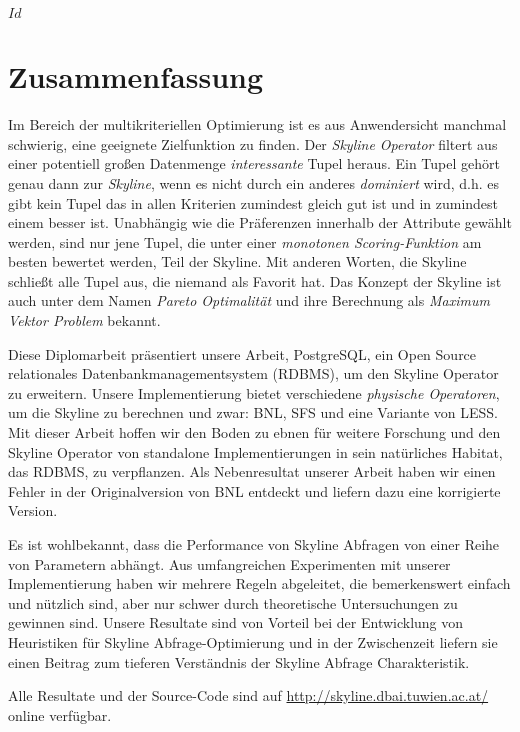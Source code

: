 
\svnInfo $Id$


\chapter*{Zusammenfassung\revision}


Im Bereich der multikriteriellen Optimierung ist es aus Anwendersicht
manchmal schwierig, eine geeignete Zielfunktion zu finden.
%
Der \emph{Skyline Operator} filtert aus einer potentiell gro\ss{}en
Datenmenge \emph{interessante} Tupel heraus.
%
Ein Tupel geh\"ort genau dann zur \emph{Skyline}, wenn es nicht durch
ein anderes \emph{dominiert} wird, d.h. es gibt kein Tupel das in allen
Kriterien zumindest gleich gut ist und in zumindest einem besser ist.
%
Unabh\"angig wie die Pr\"aferenzen innerhalb der Attribute gew\"ahlt
werden, sind nur jene Tupel, die unter einer \emph{monotonen
Scoring-Funktion} am besten bewertet werden, Teil der Skyline.
%
Mit anderen Worten, die Skyline schlie\ss{}t alle Tupel aus, die
niemand als Favorit hat.
%
Das Konzept der Skyline ist auch unter dem Namen \emph{Pareto
Optimalit\"at} und ihre Berechnung als \emph{Maximum Vektor
Problem} bekannt.


Diese Diplomarbeit pr\"asentiert unsere Arbeit, PostgreSQL, ein Open
Source relationales Datenbankmanagementsystem (RDBMS), um den Skyline Operator zu
erweitern.
%
Unsere Implementierung bietet verschiedene \emph{physische Operatoren},
um die Skyline zu berechnen und zwar: BNL, SFS und eine Variante von
LESS.
%
Mit dieser Arbeit hoffen wir den Boden zu ebnen f\"ur weitere
Forschung und den Skyline Operator von standalone Implementierungen in
sein nat\"urliches Habitat, das RDBMS, zu verpflanzen.
%
Als Nebenresultat unserer Arbeit haben wir einen Fehler in der Originalversion von BNL
entdeckt und liefern dazu eine korrigierte Version.


Es ist wohlbekannt, dass die Performance von Skyline Abfragen von einer
Reihe von Parametern abh\"angt.
%
Aus umfangreichen Experimenten mit unserer Implementierung haben wir
mehrere Regeln abgeleitet, die bemerkenswert einfach und n\"utzlich
sind, aber nur schwer durch theoretische Untersuchungen zu gewinnen
sind.
%
Unsere Resultate sind von Vorteil bei der Entwicklung von Heuristiken
f\"ur Skyline Abfrage-Optimierung und in der Zwischenzeit liefern sie
einen Beitrag zum tieferen Verst\"andnis der Skyline Abfrage
Charakteristik.


Alle Resultate und der Source-Code sind auf
\url{http://skyline.dbai.tuwien.ac.at/} online verf\"ugbar.

